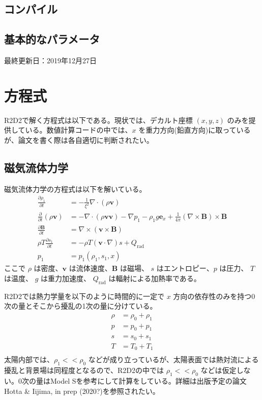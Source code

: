 \documentclass[letterpaper,10pt,dvipdfmx,report]{sphinxmanual}
\begin{document}
\section{コンパイル}
\label{\detokenize{start:id2}}

\section{基本的なパラメータ}
\label{\detokenize{start:id3}}
最終更新日：2019年12月27日


\chapter{方程式}
\label{\detokenize{equation:id1}}\label{\detokenize{equation::doc}}
R2D2で解く方程式は以下である。現状では、デカルト座標 \((x,y,z)\)  のみを提供している。数値計算コードの中では、\(x\) を重力方向(鉛直方向)に取っているが、論文を書く際は各自適切に判断されたい。


\section{磁気流体力学}
\label{\detokenize{equation:id2}}
磁気流体力学の方程式は以下を解いている。
\begin{equation*}
\begin{split}\frac{\partial \rho_1}{\partial t} &= - \frac{1}{\xi^2}\nabla\cdot
\left(\rho \boldsymbol{v}\right) \\
\frac{\partial}{\partial t}\left(\rho \boldsymbol{v}\right) &=
-\nabla\cdot\left(\rho\boldsymbol{vv}\right)
- \nabla p_1 - \rho_1 g\boldsymbol{e}_x
+\frac{1}{4\pi}\left(\nabla\times\boldsymbol{B}\right)
\times\boldsymbol{B} \\
\frac{\partial \boldsymbol{B}}{\partial t} &=
\nabla\times\left(\boldsymbol{v\times B}\right)
\\
\rho T \frac{\partial s_1}{\partial t} &= -\rho T
\left(\boldsymbol{v}\cdot\nabla\right) s + Q_\mathrm{rad} \\
p_1 &= p_1(\rho_1,s_1,x)\end{split}
\end{equation*}
ここで \(\rho\) は密度、\(\boldsymbol{v}\) は流体速度、\(\boldsymbol{B}\) は磁場、 \(s\) はエントロピー、\(p\) は圧力、 \(T\) は温度、 \(g\) は重力加速度、 \(Q_\mathrm{rad}\) は輻射による加熱率である。

R2D2では熱力学量を以下のように時間的に一定で \(x\) 方向の依存性のみを持つ0次の量とそこから擾乱の1次の量に分けている。
\begin{equation*}
\begin{split}\rho &= \rho_0 + \rho_1 \\
p &= p_0 + p_1 \\
s &= s_0 + s_1 \\
T &= T_0 + T_1 \\\end{split}
\end{equation*}
太陽内部では、\(\rho_1 << \rho_0\) などが成り立っているが、太陽表面では熱対流による擾乱と背景場は同程度となるので、R2D2の中では \(\rho_1 << \rho_0\) などは仮定しない。0次の量はModel Sを参考にして計算をしている。詳細は出版予定の論文Hotta \& Iijima, in prep (2020?)を参照されたい。
\end{document}
